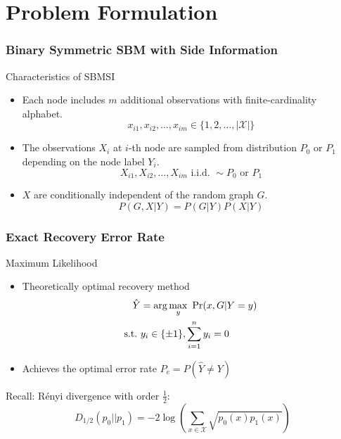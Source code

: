\documentclass[notheorems]{beamer}
\begin{document}
\section{Problem Formulation}
\begin{frame}
\frametitle{Binary Symmetric SBM with Side Information}
\begin{block}{Characteristics of SBMSI}
\begin{itemize}
	\item   Each node includes $m$ additional observations with
	finite-cardinality alphabet.
	\begin{equation*}
		x_{i1}, x_{i2}, \dots, x_{im} \in \{1, 2, \dots, |\mathcal{X}|\}
	\end{equation*}
	\item The observations $X_i$ at $i$-th node are sampled from distribution $P_0$
	or $P_1$ depending on the node label $Y_i$.
	\begin{equation*}
		X_{i1}, X_{i2}, \dots, X_{im} \textrm{ i.i.d. } \sim P_0 \textrm{ or } P_1
	\end{equation*}
	\item $X$ are conditionally independent of the random
	graph $G$.
	\begin{equation*}
		P(G, X | Y) = P(G | Y) P(X | Y)
	\end{equation*}
\end{itemize}
\end{block}

\end{frame}
\begin{frame}\frametitle{Exact Recovery Error Rate}
\begin{block}{Maximum Likelihood}
\begin{itemize}
	\item Theoretically optimal recovery method
	\begin{align*}
		\hat{Y} &= \arg\max_y\ \Pr(x,G|Y=y) \notag \\
		\textrm{s.t.} \ & y_i \in \{\pm 1\}, \sum_{i=1}^n y_i=0 \label{eq:mle}
	\end{align*}
	\item Achieves the optimal error rate $P_e=P(\hat{Y} \neq Y)$
\end{itemize}
\end{block}
Recall: Rényi divergence with order $\frac{1}{2}$:
\begin{equation*}
	D_{1/2}(p_0 || p_1) = -2\log(\sum_{x \in \mathcal{X}} \sqrt{p_0(x)p_1(x)} )
\end{equation*}
\end{frame}
\end{document}
